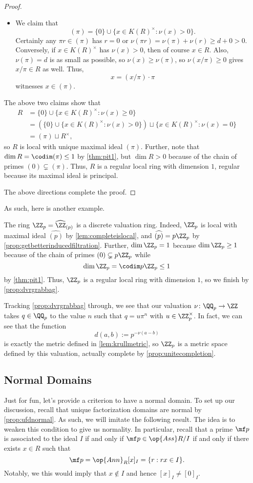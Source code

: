 \begin{proof}
\begin{itemize}
\begin{itemize}
			\item We claim that
			\[(\pi)=\{0\}\cup\{x\in K(R)^\times:\nu(x)>0\}.\]
			Certainly any $\pi r\in(\pi)$ has $r=0$ or $\nu(\pi r)=\nu(\pi)+\nu(r)\ge d+0>0$. Conversely, if $x\in K(R)^\times$ has $\nu(x)>0$, then of course $x\in R$. Also, $\nu(\pi)=d$ is as small as possible, so $\nu(x)\ge\nu(\pi)$, so $\nu(x/\pi)\ge0$ gives $x/\pi\in R$ as well. Thus,
			\[x=(x/\pi)\cdot\pi\]
			witnesses $x\in(\pi)$.
		\end{itemize}
		The above two claims show that
		\begin{align*}
			R &= \{0\}\cup\{x\in K(R)^\times:\nu(x)\ge0\} \\
			&= \left(\{0\}\cup\{x\in K(R)^\times:\nu(x)>0\}\right)\sqcup\{x\in K(R)^\times:\nu(x)=0\} \\
			&=(\pi)\sqcup R^\times,
		\end{align*}
		so $R$ is local with unique maximal ideal $(\pi)$. Further, note that $\dim R=\codim(\pi)\le1$ by \autoref{thm:pit1}, but $\dim R>0$ because of the chain of primes $(0)\subsetneq(\pi)$. Thus, $R$ is a regular local ring with dimension $1$, regular because its maximal ideal is principal.
	\end{itemize}
	The above directions complete the proof.
\end{proof}
As such, here is another example.
\begin{example}
	The ring $\ZZ_p=\widehat{\ZZ}_{(p)}$ is a discrete valuation ring. Indeed, $\ZZ_p$ is local with maximal ideal $\widehat{(p)}$ by \autoref{lem:completeislocal}, and $\widehat{(p)}=p\ZZ_p$ by \autoref{prop:getbetterinducedfiltration}. Further, $\dim\ZZ_p=1$ because $\dim\ZZ_p\ge1$ because of the chain of primes $(0)\subsetneq p\ZZ_p$ while
	\[\dim\ZZ_p=\codim p\ZZ_p\le1\]
	by \autoref{thm:pit1}. Thus, $\ZZ_p$ is a regular local ring with dimension $1$, so we finish by \autoref{prop:dvrgrabbag}.
\end{example}
\begin{remark}
	Tracking \autoref{prop:dvrgrabbag} through, we see that our valuation $\nu\colon\QQ_p\to\ZZ$ takes $q\in\QQ_p$ to the value $n$ such that $q=u\pi^n$ with $u\in\ZZ_p^\times$. In fact, we can see that the function
	\[d(a,b):=p^{-\nu(a-b)}\]
	is exactly the metric defined in \autoref{lem:krullmetric}, so $\ZZ_p$ is a metric space defined by this valuation, actually complete by \autoref{prop:unitecompletion}.
\end{remark}

\subsection{Normal Domains}
Just for fun, let's provide a criterion to have a normal domain. To set up our discussion, recall that unique factorization domains are normal by \autoref{prop:ufdnormal}. As such, we will imitate the following result.
\equivufdprop*
\noindent The idea is to weaken this condition to give us normality. In particular, recall that a prime $\mf p$ is associated to the ideal $I$ if and only if $\mf p\in\op{Ass}R/I$ if and only if there exists $x\in R$ such that
\[\mf p=\op{Ann}_R[x]_I=\{r:rx\in I\}.\]
Notably, we this would imply that $x\notin I$ and hence $[x]_I\ne[0]_I$.

